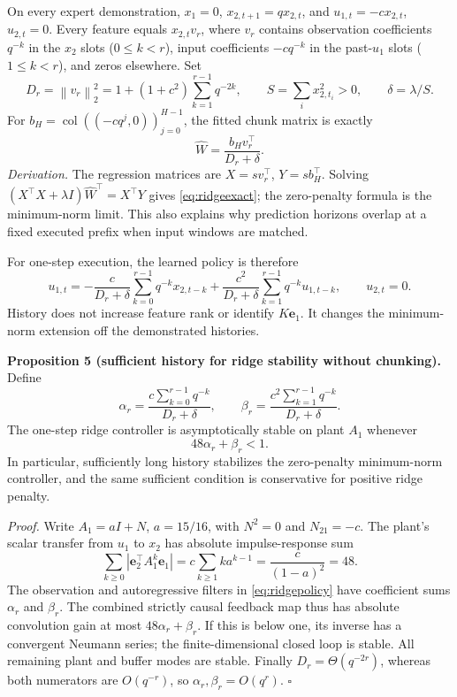 \documentclass[11pt]{article}
\newcommand{\norm}[1]{\left\lVert#1\right\rVert}
\begin{document}
On every expert demonstration, $x_1=0$, $x_{2,t+1}=qx_{2,t}$, and $u_{1,t}=-cx_{2,t}$, $u_{2,t}=0$. Every feature equals $x_{2,t}v_r$, where $v_r$ contains observation coefficients $q^{-k}$ in the $x_2$ slots ($0\le k<r$), input coefficients $-cq^{-k}$ in the past-$u_1$ slots ($1\le k<r$), and zeros elsewhere. Set
\[
D_r=\norm{v_r}_2^2=1+(1+c^2)\sum_{k=1}^{r-1}q^{-2k},\qquad
S=\sum_i x_{2,t_i}^2>0,\qquad \delta=\lambda/S.
\]
For $b_H=\operatorname{col}((-cq^j,0))_{j=0}^{H-1}$, the fitted chunk matrix is exactly
\begin{equation}
\widehat W=\frac{b_Hv_r^\top}{D_r+\delta}.
\label{eq:ridgeexact}
\end{equation}
\emph{Derivation.} The regression matrices are $X=s v_r^\top$, $Y=s b_H^\top$. Solving $(X^\top X+\lambda I)\widehat W^\top=X^\top Y$ gives \eqref{eq:ridgeexact}; the zero-penalty formula is the minimum-norm limit. This also explains why prediction horizons overlap at a fixed executed prefix when input windows are matched.

For one-step execution, the learned policy is therefore
\begin{equation}
 u_{1,t}=-\frac{c}{D_r+\delta}\sum_{k=0}^{r-1}q^{-k}x_{2,t-k}
 +\frac{c^2}{D_r+\delta}\sum_{k=1}^{r-1}q^{-k}u_{1,t-k},\qquad u_{2,t}=0.
\label{eq:ridgepolicy}
\end{equation}
History does not increase feature rank or identify $K\mathbf e_1$. It changes the minimum-norm extension off the demonstrated histories.

\textbf{Proposition 5 (sufficient history for ridge stability without chunking).} Define
\[
\alpha_r=\frac{c\sum_{k=0}^{r-1}q^{-k}}{D_r+\delta},\qquad
\beta_r=\frac{c^2\sum_{k=1}^{r-1}q^{-k}}{D_r+\delta}.
\]
The one-step ridge controller is asymptotically stable on plant $A_1$ whenever
\begin{equation}48\alpha_r+\beta_r<1.\label{eq:smallgain}\end{equation}
In particular, sufficiently long history stabilizes the zero-penalty minimum-norm controller, and the same sufficient condition is conservative for positive ridge penalty.

\emph{Proof.} Write $A_1=aI+N$, $a=15/16$, with $N^2=0$ and $N_{21}=-c$. The plant's scalar transfer from $u_1$ to $x_2$ has absolute impulse-response sum
\[
\sum_{k\ge0}|\mathbf e_2^\top A_1^k\mathbf e_1|
=c\sum_{k\ge1}k a^{k-1}=\frac{c}{(1-a)^2}=48.
\]
The observation and autoregressive filters in \eqref{eq:ridgepolicy} have coefficient sums $\alpha_r$ and $\beta_r$. The combined strictly causal feedback map thus has absolute convolution gain at most $48\alpha_r+\beta_r$. If this is below one, its inverse has a convergent Neumann series; the finite-dimensional closed loop is stable. All remaining plant and buffer modes are stable. Finally $D_r=\Theta(q^{-2r})$, whereas both numerators are $O(q^{-r})$, so $\alpha_r,\beta_r=O(q^r)$. $\square$
\end{document}
